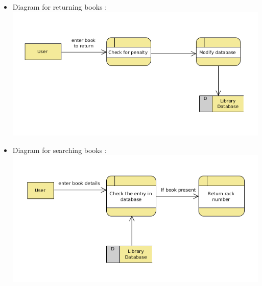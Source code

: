 \documentclass{article}
\begin{document}
\begin{itemize}
\begin{itemize}
\item Diagram for returning books : \\ \includegraphics[scale=0.5]{images/dfdDiagReturnBook.png}\\
\item Diagram for searching books : \\ \includegraphics[scale=0.5]{images/dfdDiagSearch.png}\\
\end{itemize}
\end{itemize}
\end{document}
